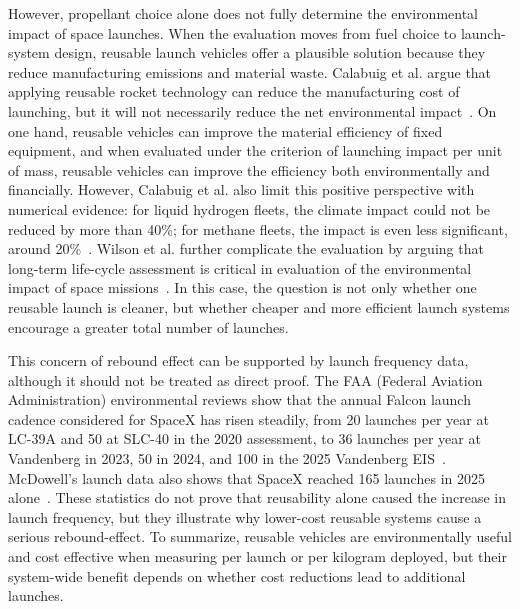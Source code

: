 \documentclass[12pt]{article}
\begin{document}
However, propellant choice alone does not fully determine the environmental impact of space launches. When the evaluation moves from fuel choice to launch-system design, reusable launch vehicles offer a plausible solution because they reduce manufacturing emissions and material waste. Calabuig et al. argue that applying reusable rocket technology can reduce the manufacturing cost of launching, but it will not necessarily reduce the net environmental impact~\citep{calabuig2024reusable}. On one hand, reusable vehicles can improve the material efficiency of fixed equipment, and when evaluated under the criterion of launching impact per unit of mass, reusable vehicles can improve the efficiency both environmentally and financially. However, Calabuig et al. also limit this positive perspective with numerical evidence: for liquid hydrogen fleets, the climate impact could not be reduced by more than 40\%; for methane fleets, the impact is even less significant, around 20\%~\citep{calabuig2024reusable}. Wilson et al. further complicate the evaluation by arguing that long-term life-cycle assessment is critical in evaluation of the environmental impact of space missions~\citep{wilson2022lifecycle}. In this case, the question is not only whether one reusable launch is cleaner, but whether cheaper and more efficient launch systems encourage a greater total number of launches.

This concern of rebound effect can be supported by launch frequency data, although it should not be treated as direct proof. The FAA (Federal Aviation Administration) environmental reviews show that the annual Falcon launch cadence considered for SpaceX has risen steadily, from 20 launches per year at LC-39A and 50 at SLC-40 in the 2020 assessment, to 36 launches per year at Vandenberg in 2023, 50 in 2024, and 100 in the 2025 Vandenberg EIS~\citep{faa2025falconprogram}. McDowell's launch data also shows that SpaceX reached 165 launches in 2025 alone~\citep{mcdowell2025space}. These statistics do not prove that reusability alone caused the increase in launch frequency, but they illustrate why lower-cost reusable systems cause a serious rebound-effect. To summarize, reusable vehicles are environmentally useful and cost effective when measuring per launch or per kilogram deployed, but their system-wide benefit depends on whether cost reductions lead to additional launches.
\end{document}
